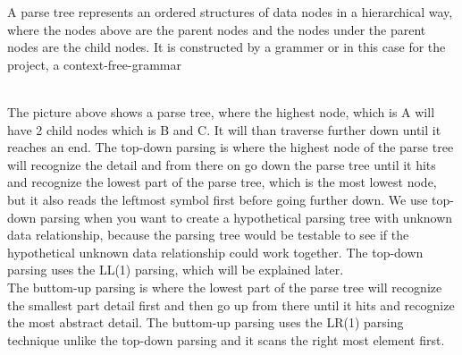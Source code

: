 A parse tree represents an ordered structures of data nodes in a hierarchical way, where the nodes above are the parent nodes and the nodes under the parent nodes are the child nodes. It is constructed by a grammer or in this case for the project, a context-free-grammar \\
\begin{figure}[H]
\centering
{}
\caption{}
\label{exampleparse}
\end{figure}
\\
The picture above shows a parse tree, where the highest node, which is A will have 2 child nodes which is B and C. It will than traverse further down until it reaches an end.
The top-down parsing is where the highest node of the parse tree will recognize the detail and from there on go down the parse tree until it hits and recognize the lowest part of the parse tree, which is the most lowest node, but it also reads the leftmost symbol first before going further down. We use top-down parsing when you want to create a hypothetical parsing tree with unknown data relationship, because the parsing tree would be testable to see if the hypothetical unknown data relationship could work together. The top-down parsing uses the LL(1) parsing, which will be explained later\cite{conceptsOfProgrammingLanguages}. 
\\
The buttom-up parsing is where the lowest  part of the parse tree will recognize the smallest part detail first and then go up from there until it hits and recognize the most abstract detail. The buttom-up parsing uses the LR(1) parsing technique unlike the top-down parsing and it scans the right most element first\cite{conceptsOfProgrammingLanguages}. 
\\
